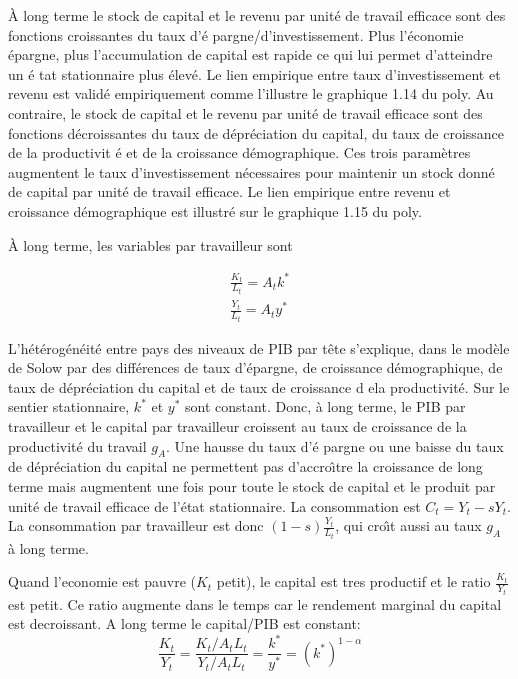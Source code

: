 \documentclass[11pt,a4paper]{article}
\begin{document}
À long terme le stock de capital et le revenu par unit\'{e} de travail
efficace sont des fonctions croissantes du taux d'\'{e}%
pargne/d'investissement. Plus l'\'{e}conomie \'{e}pargne, plus
l'accumulation de capital est rapide ce qui lui permet d'atteindre un \'{e}%
tat stationnaire plus \'{e}lev\'{e}. Le lien empirique entre taux
d'investissement et revenu est valid\'{e} empiriquement comme l'illustre le
graphique 1.14 du poly. Au contraire, le stock de capital et le revenu par
unit\'{e} de travail efficace sont des fonctions d\'{e}croissantes du taux
de d\'{e}pr\'{e}ciation du capital, du taux de croissance de la productivit%
\'{e} et de la croissance d\'{e}mographique. Ces trois param\`{e}tres
augmentent le taux d'investissement n\'{e}cessaires pour maintenir un stock
donn\'{e} de capital par unit\'{e} de travail efficace. Le lien empirique
entre revenu et croissance d\'{e}mographique est illustr\'{e} sur le
graphique 1.15 du poly.  

À long terme, les variables par travailleur sont

\begin{eqnarray*}
\frac{K_t}{L_t} = A_t k^{\ast }   \\
 \frac{Y_t}{L_t} =  A_t y^{\ast }
\end{eqnarray*}

L'h\'et\'erog\'en\'eit\'e entre pays des niveaux de PIB par
t\^ete s'explique, dans le mod\`ele de Solow par des diff\'erences de taux
d'\'epargne, de croissance d\'emographique, de taux de d\'epr\'eciation du
capital et de taux de croissance d ela productivit\'e. Sur le
sentier stationnaire, $k^{\ast }$ et $y^{\ast }$ sont constant. Donc, \`{a} long terme, le PIB par travailleur et le capital par travailleur croissent  au taux
de croissance de la productivit\'{e} du travail $g_A$. Une hausse du taux d'\'{e}%
pargne ou une baisse du taux de d\'{e}pr\'{e}ciation du capital ne
permettent pas d'accro\^{\i}tre la croissance de long terme mais augmentent
une fois pour toute le stock de capital et le produit par unit\'{e} de
travail efficace de l'\'{e}tat stationnaire. La consommation est $C_{t}=Y_t - s Y_t$. La consommation par travailleur est donc $(1-s) \frac{Y_t}{L_t}$, qui cro\^{\i}t aussi au taux $g_{A}$ \`{a} long terme. 



Quand l'economie est pauvre ($K_t$ petit), le capital est tres productif et le ratio $\frac{K_{t}}{Y_{t}}$ est petit. Ce ratio augmente dans le temps car le rendement marginal du capital est decroissant. A long terme le capital/PIB est constant:%
\begin{equation*}
\frac{K_{t}}{Y_{t}}=\frac{K_{t}/A_{t}L_{t}}{Y_{t}/A_{t}L_{t}}=\frac{k^{\ast }%
}{y^{\ast }}=\left( k^{\ast }\right) ^{1-\alpha }
\end{equation*}
\end{document}
